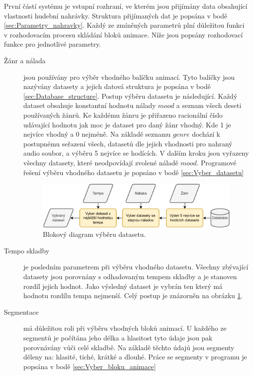 První částí systému je vstupní rozhraní, ve kterém jsou přijímány data obsahující vlastnosti hudební nahrávky. Struktura přijímaných dat je popsána v bodě \ref{sec:Parametry_nahravky}. Každý ze zmíněných parametrů plní důležitou funkci v rozhodovacím procesu skládání bloků animace. Níže jsou popsány rozhodovací funkce pro jednotlivé parametry.

\begin{description}
    \item[Žánr a nálada] jsou používány pro výběr vhodného balíčku animací. Tyto balíčky jsou nazývány datasety a jejich datová struktura je popsána v bodě \ref{sec:Database_structure}. Postup výběru datasetu je následující. Každý dataset obsahuje konstantní hodnotu nálady $mood$ a seznam všech deseti používaných žánrů. Ke každému žánru je přiřazeno racionální číslo udávající hodnotu jak moc je dataset pro daný žánr vhodný. Kde 1 je nejvíce vhodný a 0 nejméně. Na základě seznamu $genre$ dochází k postupnému seřazení všech, datasetů dle jejich vhodnosti pro nahraný audio soubor, a výběru 5 nejvíce se hodících. V dalším kroku jsou vyřazeny všechny datasety, které neodpovídají zvolené náladě $mood$. Programové řešení výběru vhodného datasetu je popsáno v bodě \ref{sec:Vyber_datasetu}
    
    \begin{figure}[H]
        \centering
        \includegraphics[width = 1\linewidth]{obrazky/Dataset_selection_diagram.pdf}
        \caption{Blokový diagram výběru datasetu.}
        \label{fig:Dataset_selection_diagram}
    \end{figure}

    \item[Tempo skladby] je posledním parametrem při výběru vhodného datasetu. Všechny zbývající datasety jsou porovnány s odhadovaným tempem skladby a je stanoven rozdíl jejich hodnot. Jako výsledný dataset je vybrán ten který má hodnotu rozdílu tempa nejmenší. Celý postup je znázorněn na obrázku \ref{fig:Dataset_selection_diagram}.
    
    \item[Segmentace] má důležitou roli při výběru vhodných bloků animací. U každého ze segmentů je počítána jeho délka a hlasitost tyto údaje jsou pak porovnávány vůči celé skladbě. Na základě těchto údajů jsou segmenty děleny na: hlasité, tiché, krátké a dlouhé. Práce se segmenty v programu je popsána v bodě \ref{sec:Vyber_bloku_animace}


\end{description}
